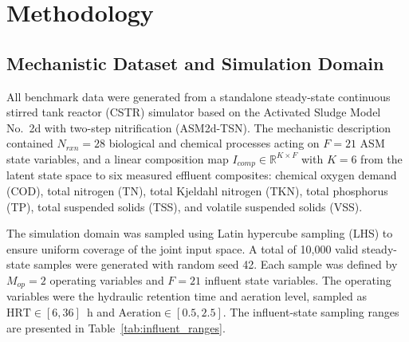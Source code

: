 \documentclass[11pt]{article}
\begin{document}
\linenumbers

\section{Methodology}

\subsection{Mechanistic Dataset and Simulation Domain}

All benchmark data were generated from a standalone steady-state continuous stirred tank reactor (CSTR) simulator based on the Activated Sludge Model No.\ 2d with two-step nitrification (ASM2d-TSN). The mechanistic description contained $N_{rxn} = 28$ biological and chemical processes acting on $F = 21$ ASM state variables, and a linear composition map $I_{comp} \in \mathbb{R}^{K \times F}$ with $K = 6$ from the latent state space to six measured effluent composites: chemical oxygen demand (COD), total nitrogen (TN), total Kjeldahl nitrogen (TKN), total phosphorus (TP), total suspended solids (TSS), and volatile suspended solids (VSS).

The simulation domain was sampled using Latin hypercube sampling (LHS) to ensure uniform coverage of the joint input space. A total of 10,000 valid steady-state samples were generated with random seed 42. Each sample was defined by $M_{op} = 2$ operating variables and $F = 21$ influent state variables. The operating variables were the hydraulic retention time and aeration level, sampled as $\mathrm{HRT} \in [6,36]$~h and $\mathrm{Aeration} \in [0.5,2.5]$. The influent-state sampling ranges are presented in Table~\ref{tab:influent_ranges}.
\end{document}
